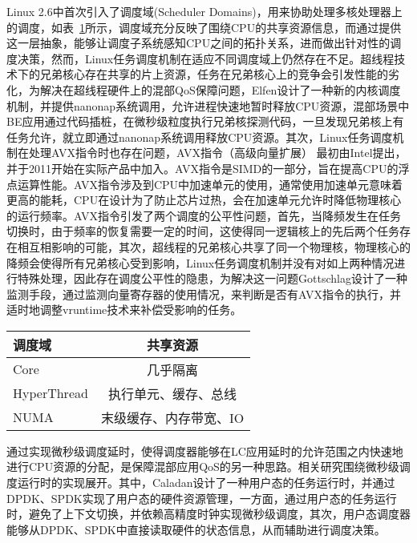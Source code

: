 Linux 2.6中首次引入了调度域(Scheduler Domains)\citep{schedulerdomains}，用来协助处理多核处理器上的调度，如表~\ref{tab:resourcesharing}所示，调度域充分反映了围绕CPU的共享资源信息，而通过提供这一层抽象，能够让调度子系统感知CPU之间的拓扑关系，进而做出针对性的调度决策，然而，Linux任务调度机制在适应不同调度域上仍然存在不足。超线程技术下的兄弟核心存在共享的片上资源，任务在兄弟核心上的竞争会引发性能的劣化，为解决在超线程硬件上的混部QoS保障问题，Elfen\citep{yang2016elfen}设计了一种新的内核调度机制，并提供nanonap系统调用，允许进程快速地暂时释放CPU资源，混部场景中BE应用通过代码插桩，在微秒级粒度执行兄弟核探测代码，一旦发现兄弟核上有任务允许，就立即通过nanonap系统调用释放CPU资源。其次，Linux任务调度机制在处理AVX指令时也存在问题，AVX指令（高级向量扩展）\citep{guide2011intel} 最初由Intel提出，并于2011开始在实际产品中加入。AVX指令是SIMD的一部分，旨在提高CPU的浮点运算性能。AVX指令涉及到CPU中加速单元的使用，通常使用加速单元意味着更高的能耗，CPU在设计为了防止芯片过热，会在加速单元允许时降低物理核心的运行频率。AVX指令引发了两个调度的公平性问题，首先，当降频发生在任务切换时，由于频率的恢复需要一定的时间，这使得同一逻辑核上的先后两个任务存在相互相影响的可能，其次，超线程的兄弟核心共享了同一个物理核，物理核心的降频会使得所有兄弟核心受到影响，Linux任务调度机制并没有对如上两种情况进行特殊处理，因此存在调度公平性的隐患，为解决这一问题Gottschlag\citep{gottschlag2020avx}设计了一种监测手段，通过监测向量寄存器的使用情况，来判断是否有AVX指令的执行，并适时地调整vruntime技术来补偿受影响的任务。

\begin{table}[!htbp]
    \label{tab:resourcesharing}
    \footnotesize%
    \setlength{\tabcolsep}{4pt}%
    \renewcommand{\arraystretch}{1.5}%
    \centering
    \begin{tabular}{lc}
        \hline
        调度域 & 共享资源\\
        \hline
        Core & 几乎隔离\\
        HyperThread & 执行单元、缓存、总线\\
        NUMA & 末级缓存、内存带宽、IO\\
        \hline
    \end{tabular}
\end{table}

通过实现微秒级调度延时，使得调度器能够在LC应用延时的允许范围之内快速地进行CPU资源的分配，是保障混部应用QoS的另一种思路。相关研究围绕微秒级调度运行时的实现\citep{ousterhout2019shenango,fried2020caladan,prekas2017zygos}展开。其中，Caladan\citep{fried2020caladan}设计了一种用户态的任务运行时，并通过DPDK、SPDK实现了用户态的硬件资源管理，一方面，通过用户态的任务运行时，避免了上下文切换，并依赖高精度时钟实现微秒级调度，其次，用户态调度器能够从DPDK、SPDK中直接读取硬件的状态信息，从而辅助进行调度决策。

